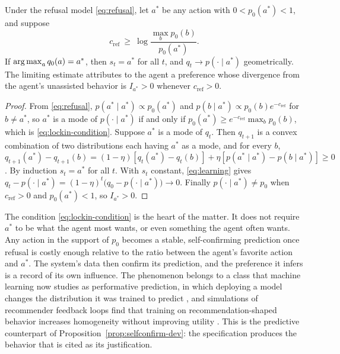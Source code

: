 \begin{proposition}\label{prop:lockin}
Under the refusal model \eqref{eq:refusal}, let $a^\ast$ be any action with $0<p_0(a^\ast)<1$, and suppose
\begin{equation}\label{eq:lockin-condition}
c_{\mathrm{ref}}\ \geq\ \log\frac{\max_bp_0(b)}{p_0(a^\ast)}.
\end{equation}
If $\operatorname*{arg\,max}_aq_0(a)=a^\ast$, then $s_t=a^\ast$ for all $t$, and $q_t\to p(\cdot\mid a^\ast)$ geometrically. The limiting estimate attributes to the agent a preference whose divergence from the agent's unassisted behavior is $I_{a^\ast}>0$ whenever $c_{\mathrm{ref}}>0$.
\end{proposition}

\begin{proof}
From \eqref{eq:refusal}, $p(a^\ast\mid a^\ast)\propto p_0(a^\ast)$ and $p(b\mid a^\ast)\propto p_0(b)e^{-c_{\mathrm{ref}}}$ for $b\neq a^\ast$, so $a^\ast$ is a mode of $p(\cdot\mid a^\ast)$ if and only if $p_0(a^\ast)\geq e^{-c_{\mathrm{ref}}}\max_bp_0(b)$, which is \eqref{eq:lockin-condition}. Suppose $a^\ast$ is a mode of $q_t$. Then $q_{t+1}$ is a convex combination of two distributions each having $a^\ast$ as a mode, and for every $b$, $q_{t+1}(a^\ast)-q_{t+1}(b)=(1-\eta)[q_t(a^\ast)-q_t(b)]+\eta[p(a^\ast\mid a^\ast)-p(b\mid a^\ast)]\geq 0$. By induction $s_t=a^\ast$ for all $t$. With $s_t$ constant, \eqref{eq:learning} gives $q_t-p(\cdot\mid a^\ast)=(1-\eta)^t\big(q_0-p(\cdot\mid a^\ast)\big)\to 0$. Finally $p(\cdot\mid a^\ast)\neq p_0$ when $c_{\mathrm{ref}}>0$ and $p_0(a^\ast)<1$, so $I_{a^\ast}>0$.
\end{proof}

The condition \eqref{eq:lockin-condition} is the heart of the matter. It does not require $a^\ast$ to be what the agent most wants, or even something the agent often wants. Any action in the support of $p_0$ becomes a stable, self-confirming prediction once refusal is costly enough relative to the ratio between the agent's favorite action and $a^\ast$. The system's data then confirm its prediction, and the preference it infers is a record of its own influence. The phenomenon belongs to a class that machine learning now studies as performative prediction, in which deploying a model changes the distribution it was trained to predict \cite{perdomo2020}, and simulations of recommender feedback loops find that training on recommendation-shaped behavior increases homogeneity without improving utility \cite{chaney2018}. This is the predictive counterpart of Proposition~\ref{prop:selfconfirm-dev}: the specification produces the behavior that is cited as its justification.

